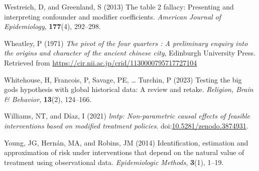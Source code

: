 \documentclass[
  single column]{article}
\newlength{\cslhangindent}
\newenvironment{CSLReferences}[2] %
 {\begin{list}{}{%
  \setlength{\itemindent}{0pt}
  \setlength{\leftmargin}{0pt}
  \setlength{\parsep}{0pt}
  \ifodd #1
   \setlength{\leftmargin}{\cslhangindent}
   \setlength{\itemindent}{-1\cslhangindent}
  \fi
  \setlength{\itemsep}{#2\baselineskip}}}
 {\end{list}}
\begin{document}
\begin{CSLReferences}{1}{0}
Westreich, D, and Greenland, S (2013) The table 2 fallacy: Presenting
and interpreting confounder and modifier coefficients. \emph{American
Journal of Epidemiology}, \textbf{177}(4), 292--298.

Wheatley, P (1971) \emph{The pivot of the four quarters : A preliminary
enquiry into the origins and character of the ancient chinese city},
Edinburgh University Press. Retrieved from
\url{https://cir.nii.ac.jp/crid/1130000795717727104}

Whitehouse, H, Francois, P, Savage, PE, \ldots{} Turchin, P (2023)
Testing the big gods hypothesis with global historical data: A review
and retake. \emph{Religion, Brain \& Behavior}, \textbf{13}(2),
124--166.

Williams, NT, and Díaz, I (2021) \emph{{l}mtp: Non-parametric causal
effects of feasible interventions based on modified treatment policies}.
doi:\href{https://doi.org/10.5281/zenodo.3874931}{10.5281/zenodo.3874931}.

Young, JG, Hernán, MA, and Robins, JM (2014) Identification, estimation
and approximation of risk under interventions that depend on the natural
value of treatment using observational data. \emph{Epidemiologic
Methods}, \textbf{3}(1), 1--19.

\end{CSLReferences}
\end{document}
